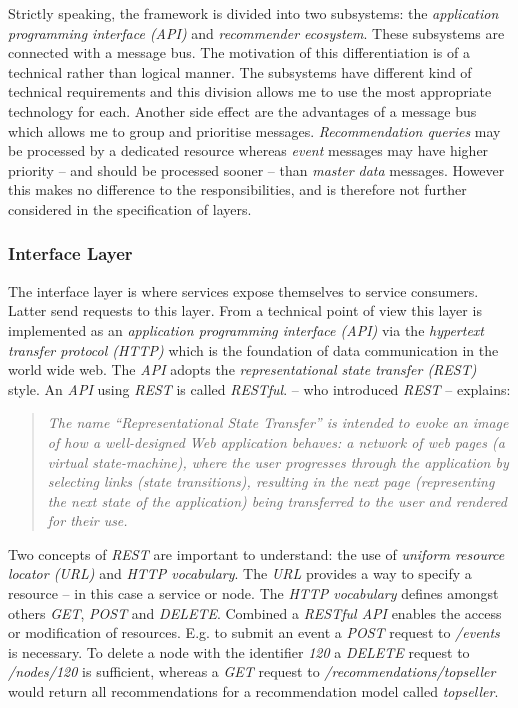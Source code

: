 Strictly speaking, the framework is divided into two subsystems: the \emph{application programming interface (API)} and \emph{recommender ecosystem}. These subsystems are connected with a message bus. The motivation of this differentiation is of a technical rather than logical manner. The subsystems have different kind of technical requirements and this division allows me to use the most appropriate technology for each. Another side effect are the advantages of a message bus which allows me to group and prioritise messages. \emph{Recommendation queries} may be processed by a dedicated resource whereas \emph{event} messages may have higher priority -- and should be processed sooner -- than \emph{master data} messages. However this makes no difference to the responsibilities, and is therefore not further considered in the specification of layers.

\subsubsection{Interface Layer}
\label{sol-design-layer-interface}

The interface layer is where services expose themselves to service consumers. Latter send requests to this layer. From a technical point of view this layer is implemented as an \emph{application programming interface (API)} via the \emph{hypertext transfer protocol (HTTP)} which is the foundation of data communication in the world wide web. The \emph{API} adopts the \emph{representational state transfer (REST)} style. An \emph{API} using \emph{REST} is called \emph{RESTful}. \citet{fielding00} -- who introduced \emph{REST} -- explains:

\begin{quotation}
    \small
    \emph{The name ``Representational State Transfer'' is intended to evoke an image of how a well-designed Web application behaves: a network of web pages (a virtual state-machine), where the user progresses through the application by selecting links (state transitions), resulting in the next page (representing the next state of the application) being transferred to the user and rendered for their use.}
\end{quotation}

Two concepts of \emph{REST} are important to understand: the use of \emph{uniform resource locator (URL)} and \emph{HTTP vocabulary}. The \emph{URL} provides a way to specify a resource -- in this case a service or node. The \emph{HTTP vocabulary} defines amongst others \emph{GET}, \emph{POST} and \emph{DELETE}. Combined a \emph{RESTful API} enables the access or modification of resources. E.g. to submit an event a \emph{POST} request to \emph{/events} is necessary. To delete a node with the identifier \emph{120} a \emph{DELETE} request to \emph{/nodes/120} is sufficient, whereas a \emph{GET} request to \emph{/recommendations/topseller} would return all recommendations for a recommendation model called \emph{topseller}.

